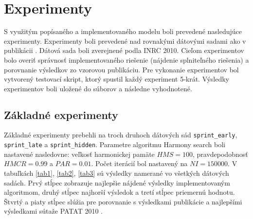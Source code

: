 \documentclass[a4paper, 14pt]{article}
\begin{document}
\section{Experimenty}
S využitým popísaného a implementovaného modelu boli prevedené nasledujúce experimenty. Experimenty boli prevedené nad rovnakými dátovými sadami ako v publikácii \cite{MainArticle}. Dátová sada boli zverejnené podla INRC 2010. Cieľom experimentov bolo overiť správnosť implementovaného riešenie (nájdenie splniteľného riešenia) a porovnanie výsledkov zo vzorovou publikáciu. Pre vykonanie experimentov bol vytvorený testovací skript, ktorý spustil každý experiment 5-krát. Výsledky experimentov boli uložené do súborov a následne vyhodnotené. 

\subsection{Základné experimenty}
Základné experimenty prebehli na troch druhoch dátových sád \texttt{sprint\_early}, \texttt{sprint\_late} a \texttt{sprint\_hidden}. Parametre algoritmu Harmony search boli nastavené nasledovne: veľkosť harmonickej pamäte $HMS = 100$, pravdepodobnosť  $HMCR = 0.99$ a $PAR = 0.01$. Počet iterácií bol nastavený na $NI = 150000$. V tabuľkách \ref{tab1}, \ref{tab2}, \ref{tab3} sú výsledky namerané vo všetkých dátových sadách. Prvý stĺpec zobrazuje najlepšie nájdené výsledky implementovaným algoritmom, druhý stĺpec najhorší výsledok a tretí stĺpec priemernú hodnotu. Štvrtý a piaty stĺpec slúžia pre porovnanie s výsledkami publikácie a najlepšími výsledkami sútaže PATAT 2010 \cite{PATAT}. 
\end{document}
